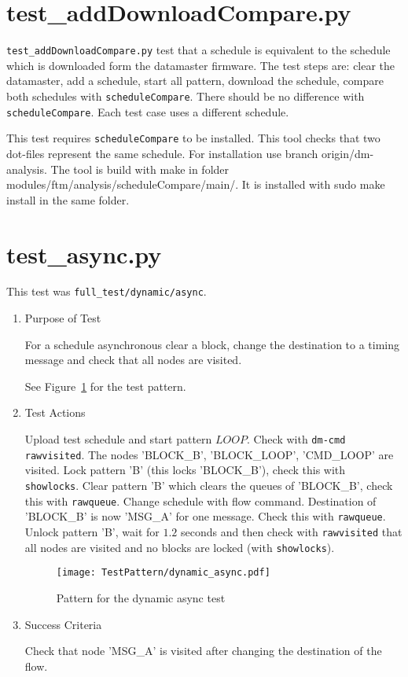 \documentclass[12pt,a4paper]{report}
\begin{document}
\section{test\_addDownloadCompare.py}
\texttt{test\_addDownloadCompare.py} test that a schedule is equivalent to the schedule which is downloaded form the datamaster firmware.
The test steps are: clear the datamaster, add a schedule, start all pattern, download the schedule, compare both schedules with \texttt{scheduleCompare}.
There should be no difference with \texttt{scheduleCompare}. Each test case uses a different schedule.

This test requires \texttt{scheduleCompare} to be installed. This tool checks that two dot-files represent the same schedule. For installation use branch
origin/dm-analysis. The tool is build with make in folder modules/ftm/analysis/scheduleCompare/main/. It is installed with sudo make install in the same folder.
\section{test\_async.py}
This test was \texttt{full\_test/dynamic/async}.
\begin{enumerate}
	\item Purpose of Test

	For a schedule asynchronous clear a block, change the destination to a timing message and check that all nodes are visited.

	See Figure~\ref{fig:Pattern_for_the_dynamic_async_test} for the test pattern.
	\item Test Actions

	Upload test schedule and start pattern $LOOP$. Check with \texttt{dm-cmd rawvisited}. The
	nodes 'BLOCK\_B', 'BLOCK\_LOOP', 'CMD\_LOOP' are visited. Lock pattern 'B' (this locks 'BLOCK\_B'), check this with
	\texttt{showlocks}. Clear pattern 'B' which clears the queues of 'BLOCK\_B', check this with \texttt{rawqueue}.
	Change schedule with flow command. Destination of 'BLOCK\_B' is now 'MSG\_A' for one message. Check this
	with \texttt{rawqueue}. Unlock pattern 'B', wait for $1.2$ seconds and then check with \texttt{rawvisited} that all
	nodes are visited and no blocks are locked (with \texttt{showlocks}).
    \begin{figure}
        \centering
        \texttt{[image: TestPattern/dynamic\_async.pdf]}
        \caption{Pattern for the dynamic async test}
        \label{fig:Pattern_for_the_dynamic_async_test}
    \end{figure}
	\item Success Criteria

	Check that node 'MSG\_A' is visited after changing the destination of the flow.
\end{enumerate}
\end{document}
